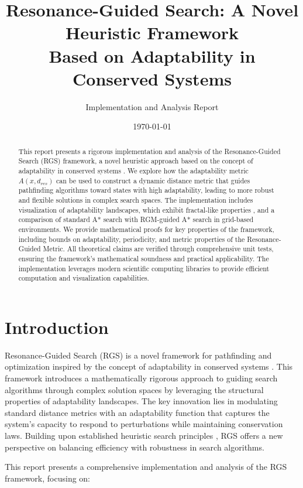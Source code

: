 \documentclass{article}
\title{Resonance-Guided Search: A Novel Heuristic Framework\\Based on Adaptability in Conserved Systems}
\author{Implementation and Analysis Report}
\date{\today}
\begin{document}
\maketitle

\begin{abstract}
This report presents a rigorous implementation and analysis of the Resonance-Guided Search (RGS) framework, a novel heuristic approach based on the concept of adaptability in conserved systems \cite{conserved}. We explore how the adaptability metric $A(x, d_{res})$ can be used to construct a dynamic distance metric that guides pathfinding algorithms toward states with high adaptability, leading to more robust and flexible solutions in complex search spaces. The implementation includes visualization of adaptability landscapes, which exhibit fractal-like properties \cite{fractals}, and a comparison of standard A* search \cite{astar} with RGM-guided A* search in grid-based environments. We provide mathematical proofs for key properties of the framework, including bounds on adaptability, periodicity, and metric properties \cite{metrics} of the Resonance-Guided Metric. All theoretical claims are verified through comprehensive unit tests, ensuring the framework's mathematical soundness and practical applicability. The implementation leverages modern scientific computing libraries \cite{numpy, matplotlib} to provide efficient computation and visualization capabilities.
\end{abstract}

\section{Introduction}
Resonance-Guided Search (RGS) is a novel framework for pathfinding and optimization inspired by the concept of adaptability in conserved systems \cite{conserved}. This framework introduces a mathematically rigorous approach to guiding search algorithms through complex solution spaces by leveraging the structural properties of adaptability landscapes. The key innovation lies in modulating standard distance metrics \cite{metrics} with an adaptability function that captures the system's capacity to respond to perturbations while maintaining conservation laws. Building upon established heuristic search principles \cite{heuristics}, RGS offers a new perspective on balancing efficiency with robustness in search algorithms.

This report presents a comprehensive implementation and analysis of the RGS framework, focusing on:
\end{document}
